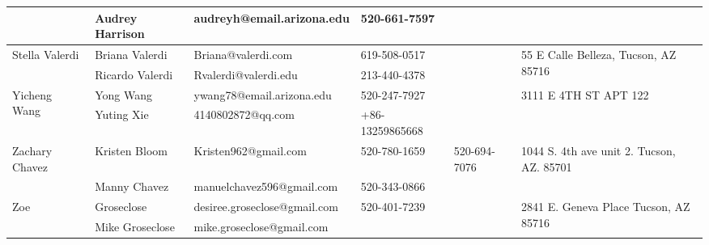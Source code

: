 \documentclass[landscape]{article}\usepackage[]{graphicx}\usepackage[]{color}
\begin{document}
\begin{longtable}{|p{100pt}|p{100pt}|p{140pt}|p{60pt}|p{64pt}|p{120pt}|}
 & Audrey Harrison & audreyh@email.arizona.edu & 520-661-7597 &  & \\
\hline
\multirow{2}{100pt}{Stella Valerdi} & Briana Valerdi & Briana@valerdi.com & 619-508-0517 &  & \multirow{2}{120pt}{55 E Calle Belleza, Tucson, AZ 85716} \\
 & Ricardo Valerdi & Rvalerdi@valerdi.edu & 213-440-4378 &  & \\
\hline
\multirow{2}{100pt}{Yicheng Wang} & Yong Wang & ywang78@email.arizona.edu & 520-247-7927 &  & \multirow{2}{120pt}{3111 E 4TH ST APT 122} \\
 & Yuting Xie & 4140802872@qq.com & +86-13259865668 &  & \\
\hline
\multirow{2}{100pt}{Zachary Chavez} & Kristen Bloom & Kristen962@gmail.com & 520-780-1659 & 520-694-7076 & \multirow{2}{120pt}{1044 S. 4th ave unit 2. Tucson, AZ. 85701} \\
 & Manny Chavez & manuelchavez596@gmail.com & 520-343-0866 &  & \\
\hline
\multirow{2}{100pt}{Zoe} & Groseclose & desiree.groseclose@gmail.com & 520-401-7239 &  & \multirow{2}{120pt}{2841 E. Geneva Place Tucson, AZ 85716} \\
 & Mike Groseclose & mike.groseclose@gmail.com &  &  & \\
\hline
\end{longtable}
\newpage
\end{document}
